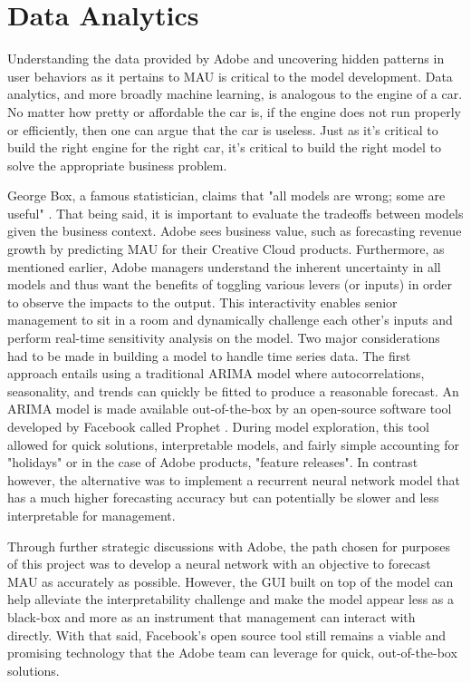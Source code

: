 \documentclass[11pt, oneside, authoryear]{report}
\begin{document}
\section{Data Analytics}
Understanding the data provided by Adobe and uncovering hidden patterns in user behaviors as it pertains to MAU is critical to the model development. Data analytics, and more broadly machine learning, is analogous to the engine of a car.  No matter how pretty or affordable the car is, if the engine does not run properly or efficiently, then one can argue that the car is useless.  Just as it's critical to build the right engine for the right car, it's critical to build the right model to solve the appropriate business problem.

George Box, a famous statistician, claims that "all models are wrong; some are useful" \citep{box}. That being said, it is important to evaluate the tradeoffs between models given the business context. Adobe sees business value, such as forecasting revenue growth by predicting MAU for their Creative Cloud products. Furthermore, as mentioned earlier, Adobe managers understand the inherent uncertainty in all models and thus want the benefits of toggling various levers (or inputs) in order to observe the impacts to the output. This interactivity enables senior management to sit in a room and dynamically challenge each other's inputs and perform real-time sensitivity analysis on the model.
Two major considerations had to be made in building a model to handle time series data. The first approach entails using a traditional ARIMA model where autocorrelations, seasonality, and trends can quickly be fitted to produce a reasonable forecast. An ARIMA model is made available out-of-the-box by an open-source software tool developed by Facebook called Prophet \citep{taylor}.  During model exploration, this tool allowed for quick solutions, interpretable models, and fairly simple accounting for "holidays" or in the case of Adobe products, "feature releases".  In contrast however, the alternative was to implement a recurrent neural network model that has a much higher forecasting accuracy but can potentially be slower and less interpretable for management.

Through further strategic discussions with Adobe, the path chosen for purposes of this project was to develop a neural network with an objective to forecast MAU as accurately as possible. However, the GUI built on top of the model can help alleviate the interpretability challenge and make the model appear less as a black-box and more as an instrument that management can interact with directly. With that said, Facebook's open source tool still remains a viable and promising technology that the Adobe team can leverage for quick, out-of-the-box solutions.
\end{document}
